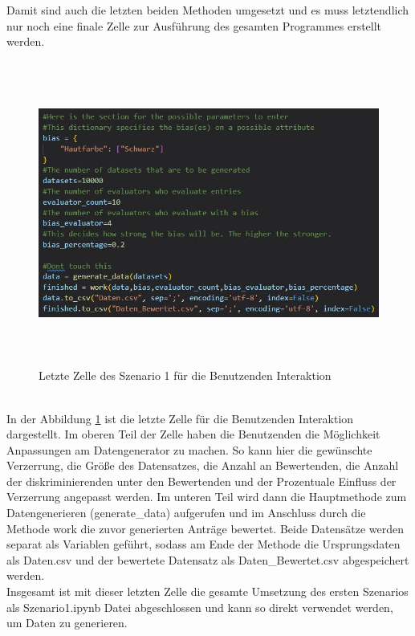 \begin{onehalfspace}
Damit sind auch die letzten beiden Methoden umgesetzt und es muss letztendlich nur noch eine finale Zelle zur Ausführung des gesamten Programmes erstellt werden.\\
\begin{figure}[h]
    \centering
    \includegraphics[width=16cm,height=10cm]{Diagramme/Sz1Final.JPG}
    \caption{Letzte Zelle des Szenario 1 für die Benutzenden Interaktion}
    \label{fig:Sz1finalCell}
\end{figure}\\
In der Abbildung \ref{fig:Sz1finalCell} ist die letzte Zelle für die Benutzenden Interaktion dargestellt. Im oberen Teil der Zelle haben die Benutzenden die Möglichkeit Anpassungen am Datengenerator zu machen. So kann hier die gewünschte Verzerrung, die Größe des Datensatzes, die Anzahl an Bewertenden, die Anzahl der diskriminierenden unter den Bewertenden und der Prozentuale Einfluss der Verzerrung angepasst werden. Im unteren Teil wird dann die Hauptmethode zum Datengenerieren (generate\_data) aufgerufen und im Anschluss durch die Methode \glqq{}work\grqq{} die zuvor generierten Anträge bewertet. Beide Datensätze werden separat als Variablen geführt, sodass am Ende der Methode die Ursprungsdaten als \glqq{}Daten.csv\grqq{} und der bewertete Datensatz als \glqq{}Daten\_Bewertet.csv\grqq{} abgespeichert werden.\\
Insgesamt ist mit dieser letzten Zelle die gesamte Umsetzung des ersten Szenarios als \glqq{}Szenario1.ipynb\grqq{} Datei abgeschlossen und kann so direkt verwendet werden, um Daten zu generieren.

\end{onehalfspace}

